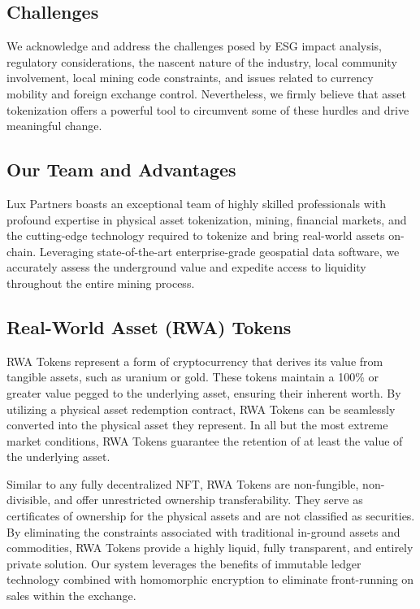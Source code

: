 \documentclass[11pt]{article}
\begin{document}
\subsection{Challenges}

We acknowledge and address the challenges posed by ESG impact analysis, regulatory considerations, the nascent nature of the industry, local community involvement, local mining code constraints, and issues related to currency mobility and foreign exchange control. Nevertheless, we firmly believe that asset tokenization offers a powerful tool to circumvent some of these hurdles and drive meaningful change.


\subsection{Our Team and Advantages}

Lux Partners boasts an exceptional team of highly skilled professionals with profound expertise in physical asset tokenization, mining, financial markets, and the cutting-edge technology required to tokenize and bring real-world assets on-chain. Leveraging state-of-the-art enterprise-grade geospatial data software, we accurately assess the underground value and expedite access to liquidity throughout the entire mining process.


\subsection{Real-World Asset (RWA) Tokens}

RWA Tokens represent a form of cryptocurrency that derives its value from tangible assets, such as uranium or gold. These tokens maintain a 100\% or greater value pegged to the underlying asset, ensuring their inherent worth. By utilizing a physical asset redemption contract, RWA Tokens can be seamlessly converted into the physical asset they represent. In all but the most extreme market conditions, RWA Tokens guarantee the retention of at least the value of the underlying asset.


Similar to any fully decentralized NFT, RWA Tokens are non-fungible, non-divisible, and offer unrestricted ownership transferability. They serve as certificates of ownership for the physical assets and are not classified as securities. By eliminating the constraints associated with traditional in-ground assets and commodities, RWA Tokens provide a highly liquid, fully transparent, and entirely private solution. Our system leverages the benefits of immutable ledger technology combined with homomorphic encryption to eliminate front-running on sales within the exchange.
\end{document}
